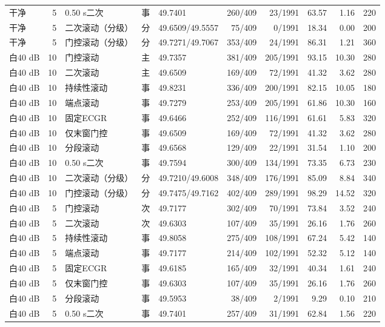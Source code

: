 \documentclass[UTF8,a4paper,11pt]{ctexart}
\begin{document}
\begin{longtable}{lrlclrrrrr}
干净 & 5 & 0.50 s二次 & 事 & 49.7401 & 260/409 & 23/1991 & 63.57 & 1.16 & 220 \\
干净 & 5 & 二次滚动（分级） & 分 & 49.6509/49.5557 & 75/409 & 0/1991 & 18.34 & 0.00 & 200 \\
干净 & 5 & 门控滚动（分级） & 分 & 49.7271/49.7067 & 353/409 & 24/1991 & 86.31 & 1.21 & 360 \\
白40 dB & 10 & 门控滚动 & 主 & 49.7357 & 381/409 & 205/1991 & 93.15 & 10.30 & 280 \\
白40 dB & 10 & 二次滚动 & 主 & 49.6509 & 169/409 & 72/1991 & 41.32 & 3.62 & 280 \\
白40 dB & 10 & 持续性滚动 & 事 & 49.8231 & 336/409 & 200/1991 & 82.15 & 10.05 & 180 \\
白40 dB & 10 & 端点滚动 & 事 & 49.7279 & 253/409 & 205/1991 & 61.86 & 10.30 & 160 \\
白40 dB & 10 & 固定ECGR & 事 & 49.6466 & 252/409 & 116/1991 & 61.61 & 5.83 & 320 \\
白40 dB & 10 & 仅末窗门控 & 事 & 49.6509 & 169/409 & 72/1991 & 41.32 & 3.62 & 280 \\
白40 dB & 10 & 分段滚动 & 事 & 49.6568 & 129/409 & 22/1991 & 31.54 & 1.10 & 200 \\
白40 dB & 10 & 0.50 s二次 & 事 & 49.7594 & 300/409 & 134/1991 & 73.35 & 6.73 & 230 \\
白40 dB & 10 & 二次滚动（分级） & 分 & 49.7210/49.6008 & 348/409 & 176/1991 & 85.09 & 8.84 & 340 \\
白40 dB & 10 & 门控滚动（分级） & 分 & 49.7475/49.7162 & 402/409 & 289/1991 & 98.29 & 14.52 & 320 \\
白40 dB & 5 & 门控滚动 & 次 & 49.7177 & 302/409 & 70/1991 & 73.84 & 3.52 & 240 \\
白40 dB & 5 & 二次滚动 & 次 & 49.6303 & 107/409 & 35/1991 & 26.16 & 1.76 & 260 \\
白40 dB & 5 & 持续性滚动 & 事 & 49.8058 & 275/409 & 108/1991 & 67.24 & 5.42 & 140 \\
白40 dB & 5 & 端点滚动 & 事 & 49.7177 & 214/409 & 102/1991 & 52.32 & 5.12 & 140 \\
白40 dB & 5 & 固定ECGR & 事 & 49.6185 & 165/409 & 32/1991 & 40.34 & 1.61 & 240 \\
白40 dB & 5 & 仅末窗门控 & 事 & 49.6303 & 107/409 & 35/1991 & 26.16 & 1.76 & 260 \\
白40 dB & 5 & 分段滚动 & 事 & 49.5953 & 38/409 & 2/1991 & 9.29 & 0.10 & 210 \\
白40 dB & 5 & 0.50 s二次 & 事 & 49.7401 & 257/409 & 31/1991 & 62.84 & 1.56 & 220 \\

\end{longtable}
\end{document}
